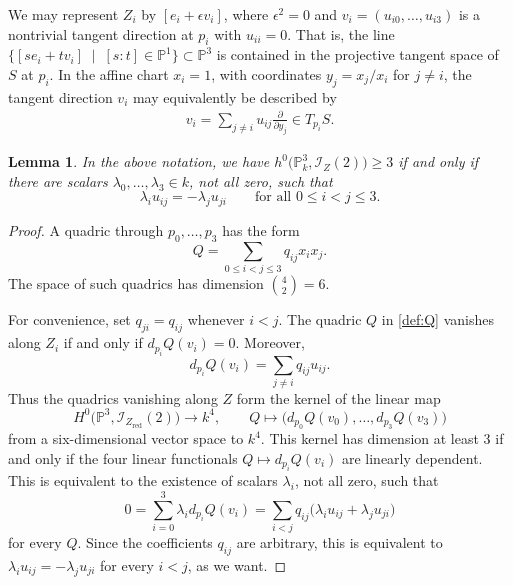 \documentclass[a4paper,11pt]{amsart}
\numberwithin{equation}{section}
\newtheorem{lemma}[theorem]{Lemma}
\theoremstyle{definition}
\theoremstyle{remark}
\newcommand{\PP}{\mathbb P}
\newcommand{\CP}{\PP}
\begin{document}
We may represent $Z_i$ by $[e_i+\epsilon v_i]$, where $\epsilon^2=0$ and $v_i=(u_{i0},\ldots,u_{i3})$ is a nontrivial tangent direction at $p_i$ with $u_{ii}=0$.
That is, the line $\{[se_i+tv_i]\; \mid \; [s:t]\in \CP^1\} \subset \CP^3$ is contained in the projective tangent space of $S$ at $p_i$. 
In the affine chart $x_i=1$, with coordinates $y_j=x_j/x_i$ for $j\neq i$, the tangent direction $v_i$ may equivalently be described by
\begin{align} \label{def:uij}
v_i=\sum_{j\neq i}u_{ij}\frac{\partial}{\partial y_j} \in T_{p_i}S.
\end{align}  

\begin{lemma}\label{lem:uij-skew-symmetric}
In the above notation, we have
$
h^0\bigl(\CP^3_k,\mathcal I_{Z}(2)\bigr)\geq 3
$
if and only if there are scalars $\lambda_0,\dots,\lambda_3\in k$,
not all zero, such that
\[
\lambda_i u_{ij}=-\lambda_j u_{ji}\qquad \text{for all $0\leq i<j\leq 3$.}
\]
\end{lemma}

\begin{proof}
A quadric through $p_0,\dots,p_3$ has the form
\begin{equation}\label{def:Q}
Q=\sum_{0\leq i<j\leq 3}q_{ij}x_ix_j.
\end{equation}
The space of such quadrics has dimension $\binom{4}{2}=6$.

For convenience, set $q_{ji}=q_{ij}$ whenever $i<j$. 
The quadric $Q$ in \eqref{def:Q} vanishes along $Z_i$ if and only if
$d_{p_i}Q(v_i)=0$. 
Moreover,
\begin{equation}\label{def:dpQ}
d_{p_i}Q(v_i)=\sum_{j\neq i}q_{ij}u_{ij}.
\end{equation}
Thus the quadrics vanishing along $Z$ form the kernel of the linear map
\[
H^0\bigl(\CP^3,\mathcal I_{Z_{\operatorname{red}}}(2)\bigr)\longrightarrow k^4,\qquad 
Q\mapsto
\bigl(d_{p_0}Q(v_0),\dots,d_{p_3}Q(v_3)\bigr) 
\]
from a six-dimensional vector space to $k^4$.
This kernel has dimension at least $3$ if and only if the four linear functionals $Q\mapsto d_{p_i}Q(v_i)$ are linearly dependent. 
This is equivalent to the existence of scalars $\lambda_i$, not all zero, such that
\begin{equation} \label{def:R}
0=\sum_{i=0}^3\lambda_i d_{p_i}Q(v_i)
 =\sum_{i<j}q_{ij}
   \bigl(\lambda_i u_{ij}+\lambda_j u_{ji}\bigr)
\end{equation}
for every $Q$. Since the coefficients $q_{ij}$ are arbitrary, this is equivalent to
$
\lambda_i u_{ij}=-\lambda_j u_{ji}
$
for every $i<j$, as we want.
\end{proof}
\end{document}

